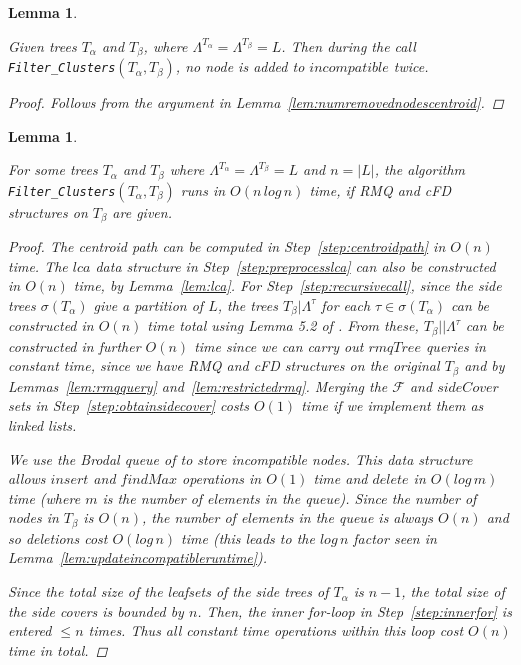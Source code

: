 \documentclass{article}
\newcommand{\leafset}{\Lambda}
\newcommand{\TA}{T_\alpha}
\newcommand{\TB}{T_\beta}
\newtheorem{numaddednodes}[incompatibility]{Lemma}
\newtheorem{filterclustersruntime}[incompatibility]{Lemma}
\begin{document}
    \begin{numaddednodes}
        \label{lem:numaddednodes}

        Given trees $\TA$ and $\TB$, where $\leafset^{\TA} = \leafset^{\TB} = L$. Then during the call \texttt{Filter\_Clusters}$(\TA, \TB)$, no node is added to $incompatible$ twice.

        \begin{proof}
            Follows from the argument in Lemma~\ref{lem:numremovednodescentroid}.
        \end{proof}
    \end{numaddednodes}

    \medskip
    \begin{filterclustersruntime}
        \label{lem:filterclustersruntime}

        For some trees $\TA$ and $\TB$ where $\leafset^{\TA} = \leafset^{\TB} = L$ and $n = |L|$, the algorithm \texttt{Filter\_Clusters}$(\TA, \TB)$ runs in $O(n\,log\,n)$ time, if RMQ and cFD structures on $\TB$ are given.

        \begin{proof}
            The centroid path can be computed in Step~\ref{step:centroidpath} in $O(n)$ time.  The $lca$ data structure in Step~\ref{step:preprocesslca} can also be constructed in $O(n)$ time, by Lemma~\ref{lem:lca}. For Step~\ref{step:recursivecall}, since the side trees $\sigma(\TA)$ give a partition of $L$, the trees $\TB|\leafset^{\tau}$ for each $\tau \in \sigma(\TA)$ can be constructed in $O(n)$ time total using Lemma 5.2 of \cite{farach1995fast}. From these, $\TB||\leafset^{\tau}$ can be constructed in further $O(n)$ time since we can carry out $rmqTree$ queries in constant time, since we have RMQ and cFD structures on the original $\TB$ and by Lemmas~\ref{lem:rmqquery} and~\ref{lem:restrictedrmq}. Merging the $\mathcal{F}$ and $sideCover$ sets in Step~\ref{step:obtainsidecover} costs $O(1)$ time if we implement them as linked lists.

            We use the Brodal queue of \cite{brodal1995fast} to store incompatible nodes. This data structure allows $insert$ and $findMax$ operations in $O(1)$ time and $delete$ in $O(log\,m)$ time (where $m$ is the number of elements in the queue). Since the number of nodes in $\TB$ is $O(n)$, the number of elements in the queue is always $O(n)$ and so deletions cost $O(log\,n)$ time (this leads to the $log\,n$ factor seen in Lemma~\ref{lem:updateincompatibleruntime}).

            Since the total size of the leafsets of the side trees of $\TA$ is $n - 1$, the total size of the side covers is bounded by $n$. Then, the inner for-loop in Step~\ref{step:innerfor} is entered $\leq n$ times. Thus all constant time operations within this loop cost $O(n)$ time in total.


\end{proof}
\end{filterclustersruntime}
\end{document}
